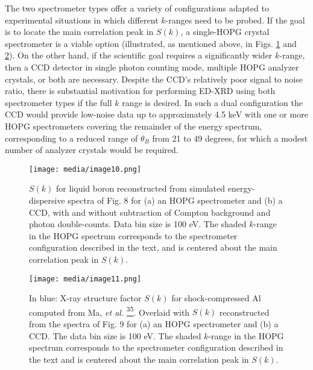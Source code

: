 The two spectrometer types offer a variety of configurations adapted to
experimental situations in which different \(k\)-ranges need to be
probed. If the goal is to locate the main correlation peak in
\(S(k)\)\emph{,} a single-HOPG crystal spectrometer is a viable option
(illustrated, as mentioned above, in Figs. \ref{edimage10} and \ref{edimage11}). On the other
hand, if the scientific goal requires a significantly wider \(k\)-range,
then a CCD detector in single photon counting mode, multiple HOPG
analyzer crystals, or both are necessary. Despite the CCD's relatively
poor signal to noise ratio, there is substantial motivation for
performing ED-XRD using both spectrometer types if the full \(k\) range
is desired. In such a dual configuration the CCD would provide low-noise
data up to approximately 4.5 keV with one or more HOPG spectrometers
covering the remainder of the energy spectrum, corresponding to a
reduced range of \(\theta_{B}\) from 21 to 49 degrees, for which a
modest number of analyzer crystals would be required.


\begin{figure} \label{edimage10}
\caption{ \(S(k)\) for liquid boron
reconstructed from simulated energy-dispersive spectra of Fig. 8 for (a)
an HOPG spectrometer and (b) a CCD, with and without subtraction of
Compton background and photon double-counts. Data bin size is 100 eV.
The shaded \(k\)-range in the HOPG spectrum corresponds to the
spectrometer configuration described in the text, and is centered about
the main correlation peak in \(S(k)\).}
\centering
\texttt{[image: media/image10.png]}
\end{figure}

\begin{figure}[h] \label{edimage11}
\caption{ In blue: X-ray structure factor \(S(k)\) for shock-compressed
Al computed from Ma, \emph{et al.}
\hyperref[t.-ma-et-al.-physical-review-letters-110-065001-2013.]{\textsuperscript{35}}.
Overlaid with \(S(k)\) reconstructed from the spectra of Fig. 9 for (a)
an HOPG spectrometer and (b) a CCD. The data bin size is 100 eV. The
shaded \(k\)-range in the HOPG spectrum corresponds to the spectrometer
configuration described in the text and is centered about the main
correlation peak in \(S(k)\).}
\centering
\texttt{[image: media/image11.png]}
\end{figure}



